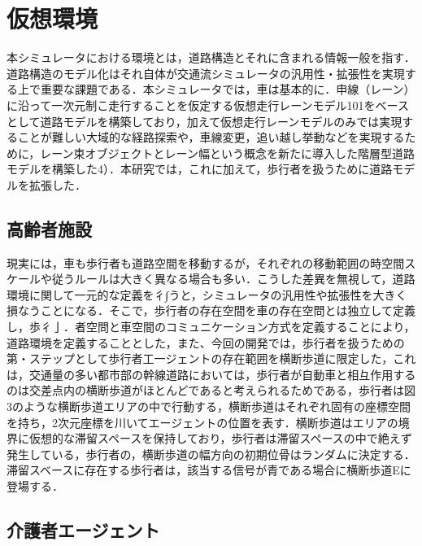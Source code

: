 \section{仮想環境}
本シミュレータにおける環境とは，道路構造とそれに含まれる情報一般を指す．道路構造のモデル化はそれ自体が交通流シミュレータの汎用性・拡張性を実現する上で重要な課題である．本シミュレータでは，車は基本的に．申線（レーン）に沿って一次元制こ走行することを仮定する仮想走行レーンモデル101をベースとして道路モデルを構築しており，加えて仮想走行レーンモデルのみでは実現することが難しい大域的な経路探索や，車線変更，追い越し挙動などを実現するために，レーン束オブジェクトとレーン幅という概念を新たに導入した階層型道路モデルを構築した4）．本研究では，これに加えて，歩行者を扱うために道路モデルを拡張した．

\subsection{高齢者施設}

現実には，車も歩行者も道路空間を移動するが，それぞれの移動範囲の時空間スケールや従うルールは大きく異なる場合も多い．こうした差異を無視して，道路環境に関して一元的な定義を彳∫うと，シミュレータの汎用性や拡張性を大きく損なうことになる．そこで，歩行者の存在空間を車の存在空問とは独立して定義し，歩彳亅．者空問と車空間のコミュニケーション方式を定義することにより，道路環境を定義することとした，また、今回の開発では，歩行者を扱うための第・ステップとして歩行者工一ジェントの存在範囲を横断歩道に限定した，これは，交通量の多い都市部の幹線道路においては，歩行者が自動車と相彑作用するのは交差点内の横断歩道がほとんどであると考えられるためである，歩行者は図3のような横断歩道エリアの中で行動する，横断歩道はそれぞれ固有の座標空間を持ち，2次元座標を川いてエージェントの位置を表す．横断歩道はエリアの境界に仮想的な滞留スペースを保持しており，歩行者は滞留スペースの中で絶えず発生している，歩行者の，横断歩道の幅方向の初期位骨はランダムに決定する．滞留スベースに存在する歩行者は，該当する信号が青である場合に横断歩道Eに登場する．

\subsection{介護者エージェント}


